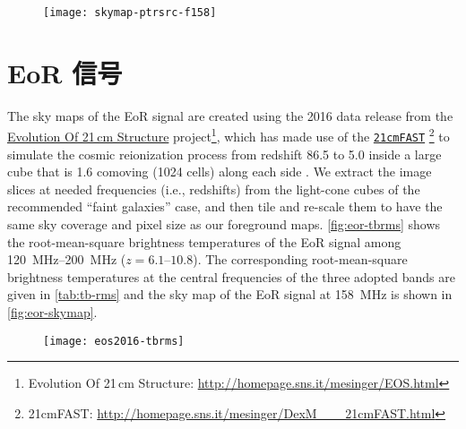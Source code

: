 \begin{figure}[htp]
  \centering
  \texttt{[image: skymap-ptrsrc-f158]}
  \label{fig:ptrsrc-skymap}
\end{figure}


\section{EoR 信号}

The sky maps of the EoR signal are created using the 2016 data release
from the
\href{http://homepage.sns.it/mesinger/EOS.html}{Evolution Of 21\,cm Structure}
project\footnote{%
  Evolution Of 21\,cm Structure:
  \url{http://homepage.sns.it/mesinger/EOS.html}},
which has made use of the
\href{http://homepage.sns.it/mesinger/DexM___21cmFAST.html}{\texttt{21cmFAST}}%
\footnote{%
  21cmFAST: \url{http://homepage.sns.it/mesinger/DexM___21cmFAST.html}
} to simulate the cosmic
reionization process from redshift 86.5 to 5.0 inside a large cube that is
1.6 comoving \si{\Gpc} (1024 cells) along each side \cite{mesinger2016}.
We extract the image slices at needed frequencies (i.e., redshifts) from
the light-cone cubes of the recommended \enquote{faint galaxies} case,
and then tile and re-scale them to have the same sky coverage and
pixel size as our foreground maps.
\autoref{fig:eor-tbrms} shows the root-mean-square brightness temperatures of the
EoR signal among \SIrange{120}{200}{\MHz} ($z = \numrange{6.1}{10.8}$).
The corresponding root-mean-square brightness temperatures at the central
frequencies of the three adopted bands are given in \autoref{tab:tb-rms}
and the sky map of the EoR signal at \SI{158}{\MHz} is shown in
\autoref{fig:eor-skymap}.

\begin{figure}[htp]
  \centering
  \texttt{[image: eos2016-tbrms]}
  \label{fig:eor-tbrms}
\end{figure}


